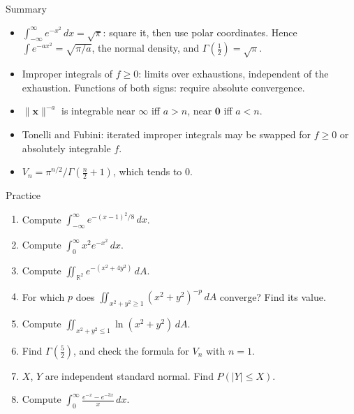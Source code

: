 \documentclass[10pt]{wosm-slides}
\newcommand{\R}{\mathbb{R}}
\newcommand{\dA}{\, dA}
\newcommand{\norm}[1]{\lVert #1 \rVert}
\newcommand{\vx}{\mathbf{x}}
\begin{document}
\begin{frame}{Summary}
  \begin{itemize}
    \item $\int_{-\infty}^\infty e^{-x^2}\, dx = \sqrt\pi$: square it, then use polar coordinates. Hence
      $\int e^{-ax^2} = \sqrt{\pi / a}$, the normal density, and $\Gamma(\frac12) = \sqrt\pi$.
    \item Improper integrals of $f \ge 0$: limits over exhaustions, independent of the exhaustion.
      Functions of both signs: require absolute convergence.
    \item $\norm{\vx}^{-a}$ is integrable near $\infty$ iff $a > n$, near $\mathbf 0$ iff $a < n$.
    \item Tonelli and Fubini: iterated improper integrals may be swapped for $f \ge 0$ or absolutely
      integrable $f$.
    \item $V_n = \pi^{n/2} / \Gamma(\frac n2 + 1)$, which tends to $0$.
  \end{itemize}
\end{frame}

\begin{frame}{Practice}
  \small
  \begin{enumerate}
    \item Compute $\int_{-\infty}^\infty e^{-(x - 1)^2/8}\, dx$.
    \item Compute $\int_0^\infty x^2 e^{-x^2}\, dx$.
    \item Compute $\iint_{\R^2} e^{-(x^2 + 4y^2)} \dA$.
    \item For which $p$ does $\iint_{x^2 + y^2 \ge 1} (x^2 + y^2)^{-p} \dA$ converge? Find its value.
    \item Compute $\iint_{x^2 + y^2 \le 1} \ln(x^2 + y^2) \dA$.
    \item Find $\Gamma(\frac52)$, and check the formula for $V_n$ with $n = 1$.
    \item $X$, $Y$ are independent standard normal. Find $P(|Y| \le X)$.
    \item Compute $\int_0^\infty \frac{e^{-x} - e^{-3x}}{x}\, dx$.
  \end{enumerate}
\end{frame}
\end{document}
